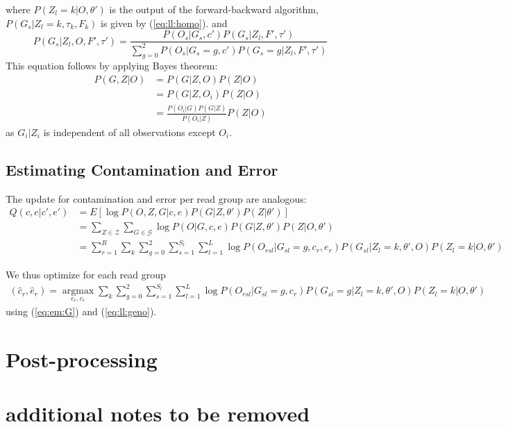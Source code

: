 \documentclass[10pt,a4paper]{article}
\begin{document}
where $P(Z_l = k |O, \theta')$ is the output of the forward-backward algorithm, $P(G_s | Z_l=k, \tau_k, F_k)$ is given by (\ref{eq:ll:homo}).   and
\begin{equation}
P(G_s | Z_l, O, F', \tau') = \frac{P(O_s | G_s, c') P(G_s | Z_l, F', \tau')}{ \sum_{g=0}^2 P(O_s | G_s=g, c') P(G_s=g | Z_l, F', \tau') }
\label{eq:em:G}
\end{equation}
This equation follows by applying Bayes theorem: 
\begin{align}
P(G,Z| O) &= P(G|Z, O)P(Z|O)\nonumber\\
&=P(G | Z, O_i) P(Z | O)\nonumber\\
&= \frac{P(O_i | G) P(G|Z)}{P(O_i | Z)} P(Z|O)
\end{align}
as $G_i | Z_i$ is independent of all observations except $O_i$.




\subsection{Estimating Contamination and Error}
The update for contamination and error per read group are analogous:
\begin{align}
Q(c, e|c', e' )&= E[\log P(O, Z, G|c, e )  P(G|Z, \theta') P(Z | \theta')]\nonumber\\
&=\sum_{Z \in \mathcal{Z}}\sum_{G \in \mathcal{G}} \log P( O | G, c, e) P(G|Z, \theta') P(Z | O, \theta')\nonumber\\
&=\sum_{r=1}^R\sum_k\sum_{g=0}^2 \sum_{s=1}^{S_l}\sum_{l=1}^L \log P(O_{rsl} | G_{sl}=g, c_r, e_r)  P(G_{sl}|Z_l=k, \theta', O) P(Z_l=k | O, \theta')
\end{align}

We thus optimize for each read group
\begin{align}
(\hat{c}_r, \hat{e}_r) = \operatorname*{argmax}_{e_r, c_r}\sum_k\sum_{g=0}^2 \sum_{s=1}^{S_l}\sum_{l=1}^L \log P(O_{rsl} | G_{sl}=g, c_r)  P(G_{sl}=g|Z_l=k, \theta', O) P(Z_l=k | O, \theta')
\end{align}
using (\ref{eq:em:G}) and (\ref{eq:ll:geno}).

\section{Post-processing}



\section{additional notes to be removed}
\end{document}

